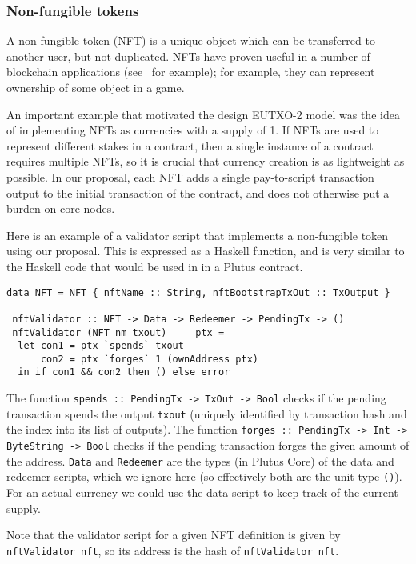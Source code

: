 \documentclass[a4paper]{article}
\theoremstyle{definition}  %
\begin{document}
\subsubsection{Non-fungible tokens}
A non-fungible token (NFT) is a unique object which can be transferred
to another user, but not duplicated.  NFTs have proven useful in a
number of blockchain applications (see~\citep{ERC-721} for example);
for example, they can represent ownership of some object in a game.

\medskip

An important example that motivated the design EUTXO-2 model was the
idea of implementing NFTs as currencies with a supply of 1. If NFTs are
used to represent different stakes in a contract, then a single
instance of a contract requires multiple NFTs, so it is crucial that
currency creation is as lightweight as possible. In our proposal, each
NFT adds a single pay-to-script transaction output to the initial
transaction of the contract, and does not otherwise put a burden on
core nodes.

\medskip
Here is an example of a validator script that implements a
non-fungible token using our proposal.  This is expressed as a Haskell
function, and is very similar to the Haskell code that would be used
in in a Plutus contract.

\begin{lstlisting}
data NFT = NFT { nftName :: String, nftBootstrapTxOut :: TxOutput }

 nftValidator :: NFT -> Data -> Redeemer -> PendingTx -> ()
 nftValidator (NFT nm txout) _ _ ptx =
  let con1 = ptx `spends` txout
      con2 = ptx `forges` 1 (ownAddress ptx)
  in if con1 && con2 then () else error
\end{lstlisting}

\noindent The function \verb|spends :: PendingTx -> TxOut -> Bool| checks if the
pending transaction spends the output \verb|txout| (uniquely
identified by transaction hash and the index into its list of
outputs). The function
\verb|forges :: PendingTx -> Int -> ByteString -> Bool|
checks if the
pending transaction forges the given amount of the
address. \verb|Data| and \verb|Redeemer| are the types (in Plutus
Core) of the data and redeemer scripts, which we ignore here (so
effectively both are the unit type \verb|()|). For an actual currency we could use the
data script to keep track of the current supply.

Note that the validator script for a given NFT definition is given by
\verb|nftValidator nft|, so its address is the hash of
\verb|nftValidator nft|.
\end{document}
